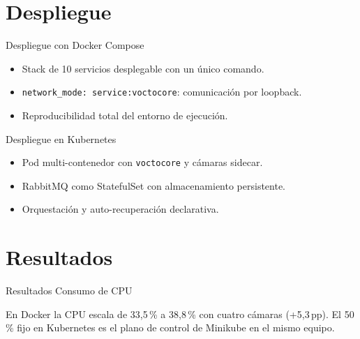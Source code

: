 \documentclass[aspectratio=169,10pt]{beamer}
\begin{document}
\section{Despliegue}

\begin{frame}{Despliegue con Docker Compose}
  \begin{itemize}
    \item Stack de 10 servicios desplegable con un \'unico comando.
    \item \texttt{network\_mode: service:voctocore}: comunicaci\'on por loopback.
    \item Reproducibilidad total del entorno de ejecuci\'on.
  \end{itemize}
\end{frame}

\begin{frame}{Despliegue en Kubernetes}
  \begin{itemize}
    \item Pod multi-contenedor con \texttt{voctocore} y c\'amaras sidecar.
    \item RabbitMQ como StatefulSet con almacenamiento persistente.
    \item Orquestaci\'on y auto-recuperaci\'on declarativa.
  \end{itemize}
\end{frame}

\section{Resultados}

\begin{frame}{Resultados \textemdash{} Consumo de CPU}
  \begin{center}
  \end{center}
  \footnotesize
  En Docker la CPU escala de 33{,}5\,\% a \alert{38{,}8\,\%} con cuatro c\'amaras
  (+5{,}3\,pp). El 50\,\% fijo en Kubernetes es el plano de control de Minikube
  en el mismo equipo.
\end{frame}
\end{document}
